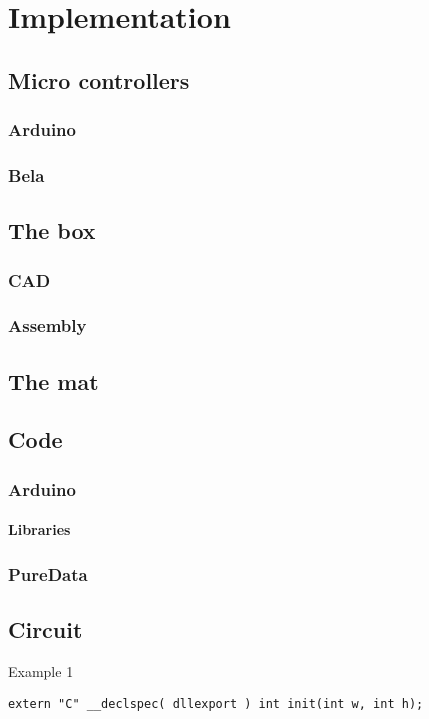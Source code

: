 \chapter{Implementation}

\section{Micro controllers}

	\subsection{Arduino}
		
		
	\subsection{Bela}
		
		
\section{The box}
	\subsection{CAD}
	\subsection{Assembly}

\section{The mat}
	

\section{Code}
	\subsection{Arduino}
		\subsubsection{Libraries}
	\subsection{PureData}
	
\section{Circuit}
	
		

\begin{listing}[H]
	\caption{Example 1}
	\label{listing:example1}
	\begin{verbatim}
extern "C" __declspec( dllexport ) int init(int w, int h);
	\end{verbatim}
\end{listing}